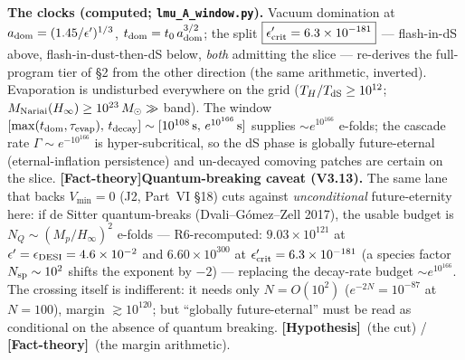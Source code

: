 \documentclass[11pt]{article}
\newcommand{\factth}{\textcolor{green!40!black}{\textbf{[Fact-theory]}}}
\newcommand{\hyp}{\textcolor{orange!80!black}{\textbf{[Hypothesis]}}}
\newcommand{\msun}{M_\odot}
\begin{document}
\textbf{The clocks (computed; \texttt{lmu\_A\_window.py}).} Vacuum domination at $a_{\rm dom}=(1.45/\epsilon')^{1/3}$, $t_{\rm dom}=t_0\,a_{\rm dom}^{3/2}$; the split $\boxed{\epsilon'_{\rm crit}=6.3\times10^{-181}}$ --- flash-in-dS above, flash-in-dust-then-dS below, \emph{both} admitting the slice --- re-derives the full-program tier of \S2 from the other direction (the same arithmetic, inverted). Evaporation is undisturbed everywhere on the grid ($T_H/T_{\rm dS}\ge10^{12}$; $M_{\rm Nariai}(H_\infty)\ge10^{23}\,\msun\gg$ band). The window $[\max(t_{\rm dom},\tau_{\rm evap}),\,t_{\rm decay}]\sim[10^{108}\,\text{s},\,e^{10^{166}}\,\text{s}]$ supplies $\sim e^{10^{166}}$ e-folds; the cascade rate $\Gamma\sim e^{-10^{166}}$ is hyper-subcritical, so the dS phase is globally future-eternal (eternal-inflation persistence) and un-decayed comoving patches are certain on the slice. \factth \textbf{Quantum-breaking caveat (V3.13).} The same lane that backs $V_{\min}=0$ (J2, Part~VI \S18) cuts against \emph{unconditional} future-eternity here: if de Sitter quantum-breaks (Dvali--G\'omez--Zell 2017), the usable budget is $N_Q\sim(M_p/H_\infty)^2$ e-folds --- R6-recomputed: $9.03\times10^{121}$ at $\epsilon'=\epsilon_{\rm DESI}=4.6\times10^{-2}$ and $6.60\times10^{300}$ at $\epsilon'_{\rm crit}=6.3\times10^{-181}$ (a species factor $N_{\rm sp}\sim10^{2}$ shifts the exponent by $-2$) --- replacing the decay-rate budget $\sim e^{10^{166}}$. The crossing itself is indifferent: it needs only $N=O(10^{2})$ ($e^{-2N}=10^{-87}$ at $N=100$), margin $\gtrsim10^{120}$; but ``globally future-eternal'' must be read as conditional on the absence of quantum breaking. \hyp\ (the cut) / \factth\ (the margin arithmetic).
\end{document}

